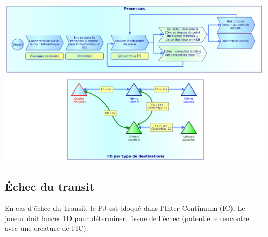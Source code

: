 \documentclass[11pt]{article}
\begin{document}
\begin{center}
\includegraphics[scale=0.21]{04-transit}
\end{center}

\subsection{Échec du transit}

En cas d'échec du Transit, le PJ est bloqué dans l'Inter-Continuum (IC). Le joueur doit lancer 1D pour déterminer l'issue de l'échec (potentielle rencontre avec une créature de l'IC).
\end{document}
